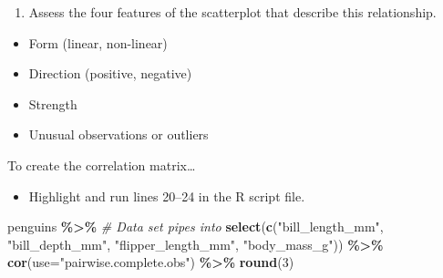 \documentclass[
]{report}
\newenvironment{Shaded}{\begin{snugshade}}{\end{snugshade}}
\newcommand{\AttributeTok}[1]{\textcolor[rgb]{0.13,0.29,0.53}{#1}}
\newcommand{\CommentTok}[1]{\textcolor[rgb]{0.56,0.35,0.01}{\textit{#1}}}
\newcommand{\DecValTok}[1]{\textcolor[rgb]{0.00,0.00,0.81}{#1}}
\newcommand{\FunctionTok}[1]{\textcolor[rgb]{0.13,0.29,0.53}{\textbf{#1}}}
\newcommand{\NormalTok}[1]{#1}
\newcommand{\SpecialCharTok}[1]{\textcolor[rgb]{0.81,0.36,0.00}{\textbf{#1}}}
\newcommand{\StringTok}[1]{\textcolor[rgb]{0.31,0.60,0.02}{#1}}
\providecommand{\tightlist}{%
  \setlength{\itemsep}{0pt}\setlength{\parskip}{0pt}}
\begin{document}
\newpage

\begin{enumerate}
\def\labelenumi{\arabic{enumi}.}
\tightlist
\item
  Assess the four features of the scatterplot that describe this relationship.
  \vspace{1mm}
\end{enumerate}

\begin{itemize}
\tightlist
\item
  Form (linear, non-linear)
\end{itemize}

\vspace{.1in}

\begin{itemize}
\tightlist
\item
  Direction (positive, negative)
\end{itemize}

\vspace{.1in}

\begin{itemize}
\tightlist
\item
  Strength
\end{itemize}

\vspace{.1in}

\begin{itemize}
\tightlist
\item
  Unusual observations or outliers
\end{itemize}

\vspace{.1in}

To create the correlation matrix\ldots{}

\begin{itemize}
\tightlist
\item
  Highlight and run lines 20--24 in the R script file.
\end{itemize}

\begin{Shaded}
\begin{Highlighting}[]
\NormalTok{penguins }\SpecialCharTok{\%\textgreater{}\%}  \CommentTok{\# Data set pipes into}
  \FunctionTok{select}\NormalTok{(}\FunctionTok{c}\NormalTok{(}\StringTok{"bill\_length\_mm"}\NormalTok{, }\StringTok{"bill\_depth\_mm"}\NormalTok{, }
           \StringTok{"flipper\_length\_mm"}\NormalTok{, }\StringTok{"body\_mass\_g"}\NormalTok{)) }\SpecialCharTok{\%\textgreater{}\%}
  \FunctionTok{cor}\NormalTok{(}\AttributeTok{use=}\StringTok{"pairwise.complete.obs"}\NormalTok{) }\SpecialCharTok{\%\textgreater{}\%}
  \FunctionTok{round}\NormalTok{(}\DecValTok{3}\NormalTok{)}
\end{Highlighting}
\end{Shaded}
\end{document}
